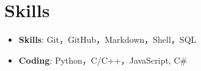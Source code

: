 \documentclass{resume}
\begin{document}
\section[Skills]{Skills}
\begin{itemize}
  \item \textbf{Skills}: Git，GitHub，Markdown，Shell，SQL
  \item \textbf{Coding}: Python，C/C++，JavaScript, C\#
\end{itemize}
\end{document}
